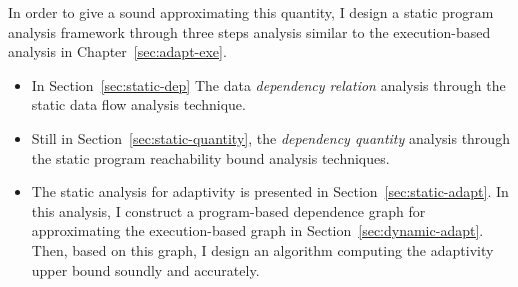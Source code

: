 In order to give a sound approximating this quantity, I design a static program analysis framework through three steps analysis
similar to the execution-based analysis in Chapter~\ref{sec:adapt-exe}.
\begin{itemize}
   \item In Section~\ref{sec:static-dep}
   The data \emph{dependency relation} analysis through the static data flow analysis technique.
   \item Still in Section~\ref{sec:static-quantity}, the \emph{dependency quantity} analysis through the static program reachability bound analysis techniques.
   \item The static analysis for adaptivity is presented in Section~\ref{sec:static-adapt}.
   In this analysis, I construct a program-based dependence graph for approximating the execution-based graph in Section~\ref{sec:dynamic-adapt}.
   Then, based on this graph, I design an algorithm
   computing the adaptivity upper bound soundly 
   and accurately.
   \end{itemize}